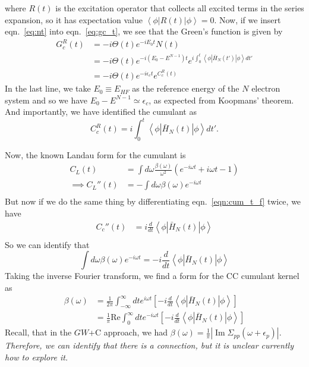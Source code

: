 where $R(t)$ is the excitation operator that collects all excited terms in the series expansion, so it has expectation value $\left< \phi \left| R(t) \right| \phi \right> = 0$. Now, if we insert eqn.~\ref{eq:nt} into eqn.~\ref{eq:gc_t}, we see that the Green's function is given by
\begin{align}
G_c^R(t) &= -i \Theta(t) e^{-iE_0 t} N(t) \\
&= -i \Theta(t) e^{-i(E_0 - E^{N-1}) t} e^{i \int_0^t \left< \phi \left| \bar{H}_N(t') \right| \phi \right> dt'} \\
&= -i \Theta(t) e^{-i \epsilon_c t} e^{C_c^R(t)}
\label{eq:gc_final}
\end{align}
In the last line, we take $E_0 \equiv E_{HF}$ as the reference energy of the $N$ electron system and so we have $E_0-E^{N-1} \simeq \epsilon_c$, as expected from Koopmans' theorem. And importantly, we have identified the cumulant as
\begin{equation}
\label{eqn:cum_t_f}
C_c^{R}(t) = i \int_0^t \left< \phi \left| \bar{H}_N(t) \right| \phi\right> dt'.
\end{equation}
\begin{tcolorbox}
Now, the known Landau form for the cumulant is
\begin{align}
C_L(t) & = \int d\omega \frac{\beta(\omega)}{\omega^2} \left(e^{-i\omega t} + i\omega t - 1\right) \\
\implies C_L''(t) & = -\int d\omega \beta(\omega) e^{-i\omega t} \\
\end{align}
But now if we do the same thing by differentiating eqn.~\ref{eqn:cum_t_f} twice, we have
\begin{align}
C_c'' (t) & = i \frac{d}{dt} \left< \phi \left| \bar{H}_N(t) \right| \phi \right> \\
\end{align}
So we can identify that
\begin{equation}
\int d\omega \beta(\omega) e^{-i\omega t} = -i \frac{d}{dt} \left< \phi \left| \bar{H}_N(t) \right| \phi \right>
\end{equation}
Taking the inverse Fourier transform, we find a form for the CC cumulant kernel as
\begin{align}
\beta(\omega) &= \frac{1}{2\pi} \int_{-\infty}^{\infty} dt e^{i\omega t} \left[-i \frac{d}{dt} \left< \phi \left| \bar{H}_N(t) \right| \phi \right> \right] \\
&= \frac{1}{\pi} \mathrm{Re} \int_0^{\infty} dt e^{-i\omega t} \left[-i \frac{d}{dt} \left< \phi \left| \bar{H}_N(t) \right| \phi \right> \right]
\end{align}
\color{red}{The above relation is not derived yet.}
\color{black}
 Recall, that in the $GW$+C approach, we had $\beta(\omega)=\frac{1}{\pi}\left|\operatorname{Im} \Sigma_{p p}(\omega+\epsilon_p)\right|$. \emph{Therefore, we can identify that there is a connection, but it is unclear currently how to explore it.}
\end{tcolorbox}

